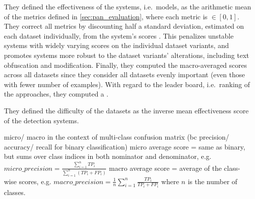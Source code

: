 They defined the effectiveness of the systems, i.e.\ models, as the arithmetic mean of the metrics defined in \autoref{sec:pan_evaluation}, 
where each metric is $\in [0, 1]$.
They correct all metrics by discounting half a standard deviation, estimated on each dataset individually, 
from the system's scores .
This penalizes unstable systems with widely varying scores on the individual dataset variants, 
and promotes systems more robust to the dataset variants' alterations, including text obfuscation and modification.
Finally, they computed the macro-averaged scores across all datasets since they consider all datasets evenly important 
(even those with fewer number of examples).
With regard to the leader board, i.e.\ ranking of the approaches, they computed a .

They defined the difficulty of the datasets as the inverse mean effectiveness score of the detection systems.


micro/ macro in the context of multi-class confusion matrix (bc precision/ accuracy/ recall for binary classification)
micro average score = same as binary, but sums over class indices in both nominator and denominator, e.g.
$micro\_precision = \frac{\sum_{i=1}^n TP_i}{\sum_{i=1}^n (TP_i + FP_i)}$
macro average score = average of the class-wise scores, e.g.
$macro\_precision = \frac{1}{n} \sum_{i=1}^n \frac{TP_i}{TP_i + FP_i}$
where $n$ is the number of classes.